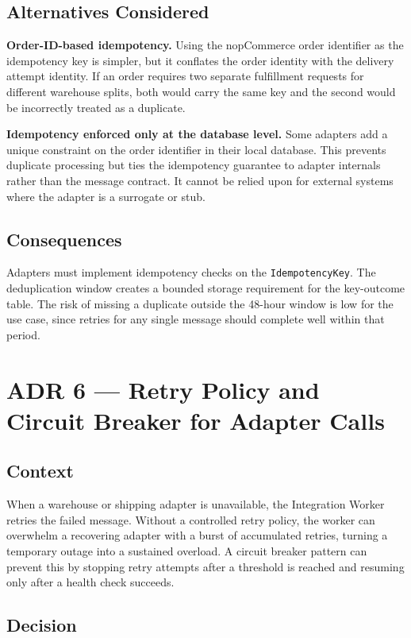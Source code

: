 \subsection{Alternatives Considered}

\textbf{Order-ID-based idempotency.} Using the nopCommerce order identifier as the idempotency
key is simpler, but it conflates the order identity with the delivery attempt identity. If an
order requires two separate fulfillment requests for different warehouse splits, both would
carry the same key and the second would be incorrectly treated as a duplicate.

\textbf{Idempotency enforced only at the database level.} Some adapters add a unique constraint
on the order identifier in their local database. This prevents duplicate processing but ties
the idempotency guarantee to adapter internals rather than the message contract. It cannot be
relied upon for external systems where the adapter is a surrogate or stub.

\subsection{Consequences}

Adapters must implement idempotency checks on the \texttt{IdempotencyKey}. The deduplication
window creates a bounded storage requirement for the key-outcome table. The risk of missing a
duplicate outside the 48-hour window is low for the use case, since retries for any single
message should complete well within that period.

\section{ADR 6 --- Retry Policy and Circuit Breaker for Adapter Calls}

\subsection{Context}

When a warehouse or shipping adapter is unavailable, the Integration Worker retries the failed
message. Without a controlled retry policy, the worker can overwhelm a recovering adapter with
a burst of accumulated retries, turning a temporary outage into a sustained overload. A circuit
breaker pattern can prevent this by stopping retry attempts after a threshold is reached and
resuming only after a health check succeeds.

\subsection{Decision}


